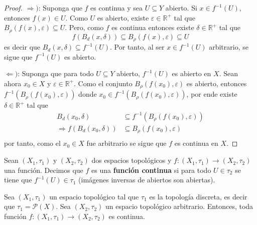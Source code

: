 \documentclass[12pt]{report}
\theoremstyle{largebreak}
\newcommand\cf[3]{\ensuremath{#1:#2\rightarrow#3}}
\begin{document}
    \begin{proof}
        $\Rightarrow)$: Suponga que $f$ es continua y sea $U\subseteq Y$ abierto. Si $x\in f^{-1}(U)$, entonces $f(x)\in U$. Como $U$ es abierto, existe $\varepsilon\in\mathbb{R}^+$ tal que $B_\rho(f(x),\varepsilon)\subseteq U$. Pero, como $f$ es continua entonces existe $\delta\in\mathbb{R}^+$ tal que 
        \begin{equation*}
            f(B_d(x,\delta))\subseteq B_\rho(f(x),\varepsilon)\subseteq U
        \end{equation*}
        es decir que $B_d(x,\delta)\subseteq f^{-1}(U)$. Por tanto, al ser $x\in f^{-1}(U)$ arbitrario, se sigue que $f^{-1}(U)$ es abierto.

        $\Leftarrow)$: Suponga que para todo $U\subseteq Y$ abierto, $f^{-1}(U)$ es abierto en $X$. Sean ahora $x_0\in X$ y $\varepsilon\in\mathbb{R}^+$. Como el conjunto $B_\rho(f(x_0),\varepsilon)$ es abierto, entonces $f^{-1}(B_\rho(f(x_0),\varepsilon))$ donde $x_0\in f^{-1}(B_\rho(f(x_0),\varepsilon))$, por ende existe $\delta\in\mathbb{R}^+$ tal que
        \begin{equation*}
            \begin{split}
                B_d(x_0,\delta)&\subseteq f^{-1}(B_\rho(f(x_0),\varepsilon))\\
                \Rightarrow f(B_d(x_0,\delta))&\subseteq B_\rho(f(x_0),\varepsilon)\\
            \end{split}
        \end{equation*}
        por tanto, como el $x_0\in X$ fue arbitrario se sigue que $f$ es continua en $X$.
    \end{proof}

    \begin{mydef}
        Sean $(X_1,\tau_1)$ y $(X_2,\tau_2)$ dos espacios topológicos y $\cf{f}{(X_1,\tau_1)}{(X_2,\tau_2)}$ una función. Decimos que $f$ es una \textbf{función continua} si para todo $U\in\tau_2$ se tiene que $f^{-1}(U)\in\tau_1$ (imágenes inversas de abiertos son abiertas).
    \end{mydef}

    \begin{exa}
        Sea $(X_1,\tau_1)$ un espacio topológico tal que $\tau_1$ es la topología discreta, es decir que $\tau_1=\mathcal{P}(X)$. Sea $(X_2,\tau_2)$ un espacio topológico arbitrario. Entonces, toda función $\cf{f}{(X_1,\tau_1)}{(X_2,\tau_2)}$ es continua.
    \end{exa}
\end{document}
